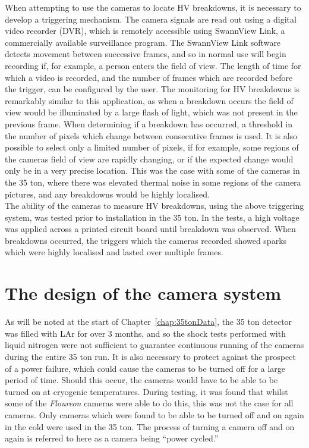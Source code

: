 When attempting to use the cameras to locate HV breakdowns, it is necessary to develop a triggering mechanism. The camera signals are read out using a digital video recorder (DVR), which is remotely accessible using SwannView Link, a commercially available surveillance program. The SwannView Link software detects movement between successive frames, and so in normal use will begin recording if, for example, a person enters the field of view. The length of time for which a video is recorded, and the number of frames which are recorded before the trigger, can be configured by the user. The monitoring for HV breakdowns is remarkably similar to this application, as when a breakdown occurs the field of view would be illuminated by a large flash of light, which was not present in the previous frame. When determining if a breakdown has occurred, a threshold in the number of pixels which change between consecutive frames is used. It is also possible to select only a limited number of pixels, if for example, some regions of the cameras field of view are rapidly changing, or if the expected change would only be in a very precise location. This was the case with some of the cameras in the 35 ton, where there was elevated thermal noise in some regions of the camera pictures, and any breakdowns would be highly localised. \\

The ability of the cameras to measure HV breakdowns, using the above triggering system, was tested prior to installation in the 35 ton. In the tests, a high voltage was applied across a printed circuit board until breakdown was observed. When breakdowns occurred, the triggers which the cameras recorded showed sparks which were highly localised and lasted over multiple frames. \\

\section{The design of the camera system} \label{sec:CamDesign} %

As will be noted at the start of Chapter~\ref{chap:35tonData}, the 35 ton detector was filled with LAr for over 3 months, and so the shock tests performed with liquid nitrogen were not sufficient to guarantee continuous running of the cameras during the entire 35 ton run. It is also necessary to protect against the prospect of a power failure, which could cause the cameras to be turned off for a large period of time. Should this occur, the cameras would have to be able to be turned on at cryogenic temperatures. During testing, it was found that whilst some of the \emph{Floureon} cameras were able to do this, this was not the case for all cameras. Only cameras which were found to be able to be turned off and on again in the cold were used in the 35 ton. The process of turning a camera off and on again is referred to here as a camera being ``power cycled.'' \\

